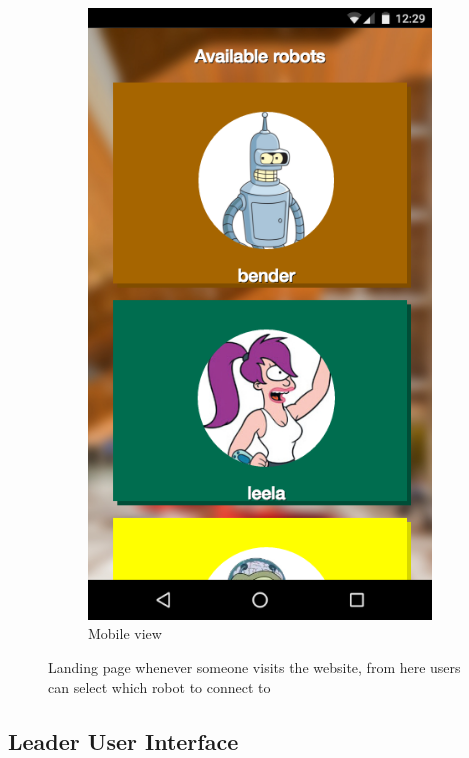 \documentclass[
  oneside,
  11pt, a4paper,
  footinclude=true,
  headinclude=true,
  cleardoublepage=empty
]{article}
\begin{document}
\begin{figure}[!tbp]
\begin{subfigure}[b]{0.25\textwidth}
    \includegraphics[width=\textwidth]{mobile_homepage}
    \caption{Mobile view}
  \end{subfigure}
  \caption{Landing page whenever someone visits the website, from here users
  can select which robot to connect to}
  \label{fig:homepage}
\end{figure}

\subsection{Leader User Interface}
\end{document}
